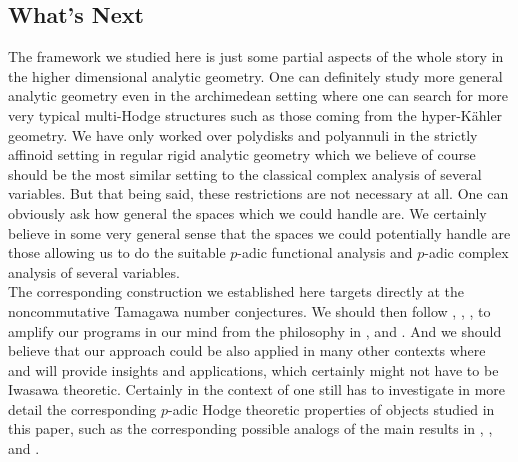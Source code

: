 \documentclass[12pt]{amsart}
\theoremstyle{definition}
\numberwithin{equation}{section}
\begin{document}
\subsection{What's Next}

The framework we studied here is just some partial aspects of the whole story in the higher dimensional analytic geometry. One can definitely study more general analytic geometry even in the archimedean setting where one can search for more very typical multi-Hodge structures such as those coming from the hyper-K\"ahler geometry. We have only worked over polydisks and polyannuli in the strictly affinoid setting in regular rigid analytic geometry which we believe of course should be the most similar setting to the classical complex analysis of several variables. But that being said, these restrictions are not necessary at all. One can obviously ask how general the spaces which we could handle are. We certainly believe in some very general sense that the spaces we could potentially handle are those allowing us to do the suitable $p$-adic functional analysis and $p$-adic complex analysis of several variables.\\

The corresponding construction we established here targets directly at the noncommutative Tamagawa number conjectures. We should then follow \cite{Nak1}, \cite{Nak2}, \cite{Zah1}, \cite{PZ19} to amplify our programs in our mind from the philosophy in \cite{BF1}, \cite{BF2} and \cite{FK}. And we should believe that our approach could be also  applied in many other contexts where \cite{Kie1} and \cite{KL3} will provide insights and applications, which certainly might not have to be Iwasawa theoretic. Certainly in the context of \cite{PZ19} one still has to investigate in more detail the corresponding $p$-adic Hodge theoretic properties of objects studied in this paper, such as the corresponding possible analogs of the main results in \cite{Ked1}, \cite{And1}, \cite{Me} and \cite{Ber1}.\\

\newpage 
\end{document}
